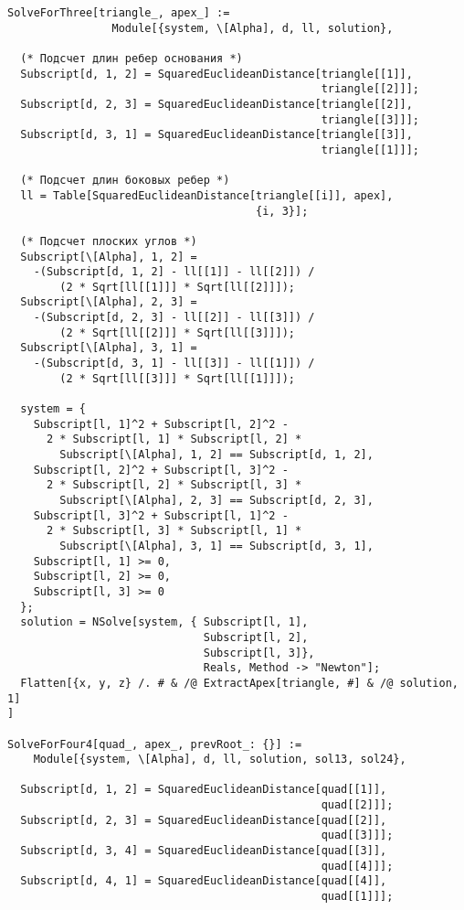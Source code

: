 \documentclass[../main.tex]{subfiles}
\begin{document}
\begin{lstlisting}
SolveForThree[triangle_, apex_] :=
                Module[{system, \[Alpha], d, ll, solution},

  (* Подсчет длин ребер основания *)
  Subscript[d, 1, 2] = SquaredEuclideanDistance[triangle[[1]],
                                                triangle[[2]]];
  Subscript[d, 2, 3] = SquaredEuclideanDistance[triangle[[2]],
                                                triangle[[3]]];
  Subscript[d, 3, 1] = SquaredEuclideanDistance[triangle[[3]],
                                                triangle[[1]]];

  (* Подсчет длин боковых ребер *)
  ll = Table[SquaredEuclideanDistance[triangle[[i]], apex],
                                      {i, 3}];

  (* Подсчет плоских углов *)
  Subscript[\[Alpha], 1, 2] =
    -(Subscript[d, 1, 2] - ll[[1]] - ll[[2]]) /
        (2 * Sqrt[ll[[1]]] * Sqrt[ll[[2]]]);
  Subscript[\[Alpha], 2, 3] =
    -(Subscript[d, 2, 3] - ll[[2]] - ll[[3]]) /
        (2 * Sqrt[ll[[2]]] * Sqrt[ll[[3]]]);
  Subscript[\[Alpha], 3, 1] =
    -(Subscript[d, 3, 1] - ll[[3]] - ll[[1]]) /
        (2 * Sqrt[ll[[3]]] * Sqrt[ll[[1]]]);

  system = {
    Subscript[l, 1]^2 + Subscript[l, 2]^2 -
      2 * Subscript[l, 1] * Subscript[l, 2] *
        Subscript[\[Alpha], 1, 2] == Subscript[d, 1, 2],
    Subscript[l, 2]^2 + Subscript[l, 3]^2 -
      2 * Subscript[l, 2] * Subscript[l, 3] *
        Subscript[\[Alpha], 2, 3] == Subscript[d, 2, 3],
    Subscript[l, 3]^2 + Subscript[l, 1]^2 -
      2 * Subscript[l, 3] * Subscript[l, 1] *
        Subscript[\[Alpha], 3, 1] == Subscript[d, 3, 1],
    Subscript[l, 1] >= 0,
    Subscript[l, 2] >= 0,
    Subscript[l, 3] >= 0
  };
  solution = NSolve[system, { Subscript[l, 1],
                              Subscript[l, 2],
                              Subscript[l, 3]},
                              Reals, Method -> "Newton"];
  Flatten[{x, y, z} /. # & /@ ExtractApex[triangle, #] & /@ solution, 1]
]

SolveForFour4[quad_, apex_, prevRoot_: {}] :=
    Module[{system, \[Alpha], d, ll, solution, sol13, sol24},

  Subscript[d, 1, 2] = SquaredEuclideanDistance[quad[[1]],
                                                quad[[2]]];
  Subscript[d, 2, 3] = SquaredEuclideanDistance[quad[[2]],
                                                quad[[3]]];
  Subscript[d, 3, 4] = SquaredEuclideanDistance[quad[[3]],
                                                quad[[4]]];
  Subscript[d, 4, 1] = SquaredEuclideanDistance[quad[[4]],
                                                quad[[1]]];


\end{lstlisting}
\end{document}
